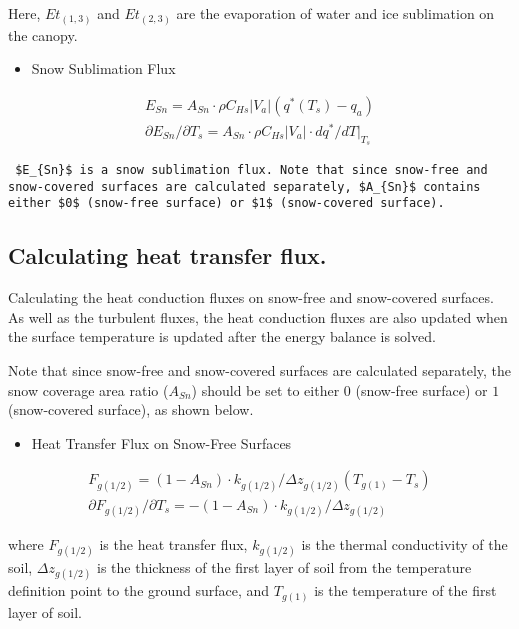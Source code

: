 Here, \(Et_{(1,3)}\) and \(Et_{(2,3)}\) are the evaporation of water and
ice sublimation on the canopy.

\begin{itemize}
\tightlist
\item
  Snow Sublimation Flux
\end{itemize}

\begin{eqnarray}
 E_{Sn} = A_{Sn}\cdot \rho C_{Hs}|V_a|(q^*(T_s) - q_a) \\
 \partial E_{Sn}/\partial T_s = A_{Sn}\cdot \rho C_{Hs}|V_a|
 \cdot dq^*/dT|_{T_s}
\end{eqnarray}

\begin{verbatim}
 $E_{Sn}$ is a snow sublimation flux. Note that since snow-free and snow-covered surfaces are calculated separately, $A_{Sn}$ contains either $0$ (snow-free surface) or $1$ (snow-covered surface).
\end{verbatim}

\hypertarget{calculating-heat-transfer-flux.}{%
\subsection{Calculating heat transfer
flux.}\label{calculating-heat-transfer-flux.}}

Calculating the heat conduction fluxes on snow-free and snow-covered
surfaces. As well as the turbulent fluxes, the heat conduction fluxes
are also updated when the surface temperature is updated after the
energy balance is solved.

Note that since snow-free and snow-covered surfaces are calculated
separately, the snow coverage area ratio (\(A_{Sn}\)) should be set to
either \(0\) (snow-free surface) or \(1\) (snow-covered surface), as
shown below.

\begin{itemize}
\tightlist
\item
  Heat Transfer Flux on Snow-Free Surfaces
\end{itemize}

\begin{eqnarray}
  F_{g(1/2)} = (1 - A_{Sn}) \cdot k_{g(1/2)} / \Delta z_{g(1/2)} (T_{g(1)} - T_s) \\
  \partial F_{g(1/2)}/\partial T_s =
  - (1 - A_{Sn}) \cdot k_{g(1/2)} / \Delta z_{g(1/2)}
\end{eqnarray}

where \(F_{g(1/2)}\) is the heat transfer flux, \(k_{g(1/2)}\) is the
thermal conductivity of the soil, \(\Delta z_{g(1/2)}\) is the thickness
of the first layer of soil from the temperature definition point to the
ground surface, and \(T_{g(1)}\) is the temperature of the first layer
of soil.

